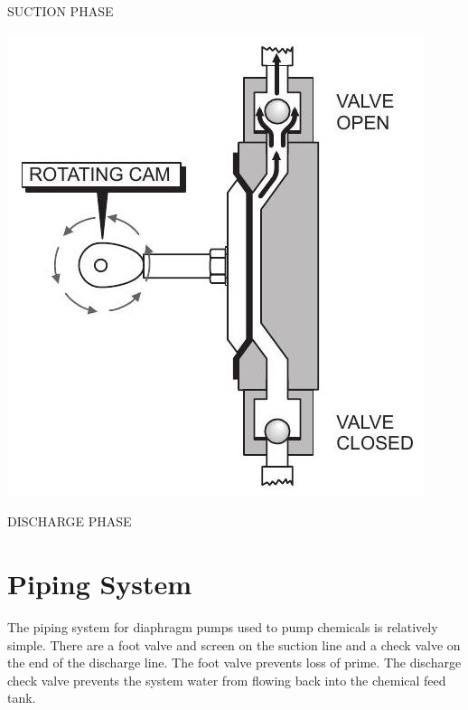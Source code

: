 \documentclass[10pt]{article}
\begin{document}
SUCTION PHASE

\includegraphics[max width=\textwidth]{DiaphragmPumpDischargePhase}

DISCHARGE PHASE

\section{Piping System}
The piping system for diaphragm pumps used to pump chemicals is relatively simple. There are a foot valve and screen on the suction line and a check valve on the end of the discharge line. The foot valve prevents loss of prime. The discharge check valve prevents the system water from flowing back into the chemical feed tank.
\end{document}
